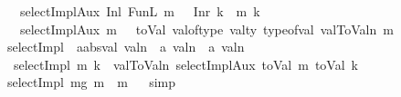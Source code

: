 \begin{isabellebody}
\ \ {\isacharbar}{\kern0pt}\ {\isachardoublequoteopen}selectImplAux\ {\isacharparenleft}{\kern0pt}Inl\ {\isacharparenleft}{\kern0pt}FunL\ m\ {\isacharunderscore}{\kern0pt}\ {\isacharunderscore}{\kern0pt}{\isacharparenright}{\kern0pt}{\isacharparenright}{\kern0pt}\ {\isacharparenleft}{\kern0pt}Inr\ k{\isacharparenright}{\kern0pt}\ {\isacharequal}{\kern0pt}\ {\isacharparenleft}{\kern0pt}m\ k{\isacharparenright}{\kern0pt}{\isachardoublequoteclose}\isanewline
\ \ {\isacharbar}{\kern0pt}\ {\isachardoublequoteopen}selectImplAux\ m\ {\isacharunderscore}{\kern0pt}\ {\isacharequal}{\kern0pt}\ toVal{}{}{}{}\ {\isacharparenleft}{\kern0pt}val{\isacharunderscore}{\kern0pt}of{\isacharunderscore}{\kern0pt}type\ {\isacharparenleft}{\kern0pt}val{\isacharunderscore}{\kern0pt}ty\ {\isacharparenleft}{\kern0pt}type{\isacharunderscore}{\kern0pt}of{\isacharunderscore}{\kern0pt}val\ {\isacharparenleft}{\kern0pt}val{}ToValn\ m{\isacharparenright}{\kern0pt}{\isacharparenright}{\kern0pt}{\isacharparenright}{\kern0pt}{\isacharparenright}{\kern0pt}{\isachardoublequoteclose}\isanewline
\isanewline
{}\isamarkupfalse%
\ selectImpl\ {\isacharcolon}{\kern0pt}{\isacharcolon}{\kern0pt}\ {\isachardoublequoteopen}{\isacharprime}{\kern0pt}a{\isacharcolon}{\kern0pt}{\isacharcolon}{\kern0pt}absval\ valn\ {\isasymRightarrow}\ {\isacharprime}{\kern0pt}a\ valn\ {\isasymRightarrow}\ {\isacharprime}{\kern0pt}a\ valn{\isachardoublequoteclose}\ \isanewline
\ \ {\isachardoublequoteopen}selectImpl\ m\ k\ {\isacharequal}{\kern0pt}\ val{}ToValn\ {\isacharparenleft}{\kern0pt}selectImplAux\ {\isacharparenleft}{\kern0pt}toVal{}{}{}{}\ m{\isacharparenright}{\kern0pt}\ {\isacharparenleft}{\kern0pt}toVal{}{}{}{}\ k{\isacharparenright}{\kern0pt}{\isacharparenright}{\kern0pt}{\isachardoublequoteclose}\isanewline
\isanewline
{}\isamarkupfalse%
\ {\isachardoublequoteopen}selectImpl\ mg{}\ m{}{}\ {\isacharequal}{\kern0pt}\ m{}{}{\isachardoublequoteclose}%
\isadelimproof
\ %
\endisadelimproof
%
\isatagproof
{}\isamarkupfalse%
\ simp%
\endisatagproof
{\isafoldproof}%
%
\isadelimproof
%
\endisadelimproof
%
\isadelimdocument
%
\endisadelimdocument
%
\isatagdocument
%
\isamarkuptrue%
%
\endisatagdocument
{\isafolddocument}%
%
\isadelimdocument
%
\endisadelimdocument
{}\isamarkupfalse%

\end{isabellebody}

